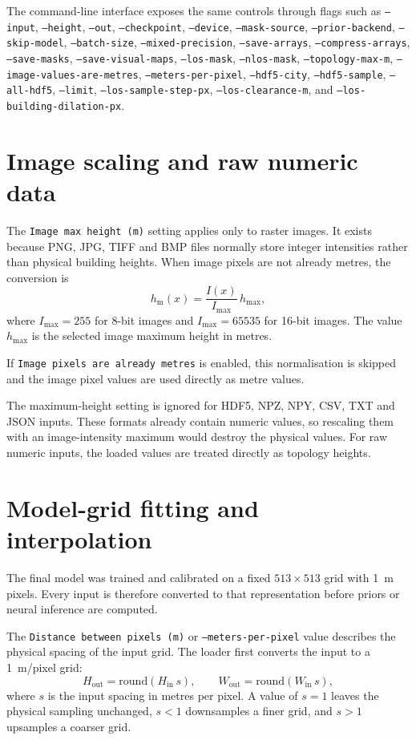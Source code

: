 The command-line interface exposes the same controls through flags such as
\texttt{--input}, \texttt{--height}, \texttt{--out},
\texttt{--checkpoint}, \texttt{--device}, \texttt{--mask-source},
\texttt{--prior-backend},
\texttt{--skip-model}, \texttt{--batch-size}, \texttt{--mixed-precision},
\texttt{--save-arrays}, \texttt{--compress-arrays}, \texttt{--save-masks},
\texttt{--save-visual-maps}, \texttt{--los-mask}, \texttt{--nlos-mask},
\texttt{--topology-max-m}, \texttt{--image-values-are-metres},
\texttt{--meters-per-pixel}, \texttt{--hdf5-city},
\texttt{--hdf5-sample}, \texttt{--all-hdf5}, \texttt{--limit},
\texttt{--los-sample-step-px}, \texttt{--los-clearance-m}, and
\texttt{--los-building-dilation-px}.

\section{Image scaling and raw numeric data}

The \texttt{Image max height (m)} setting applies only to raster images. It
exists because PNG, JPG, TIFF and BMP files normally store integer intensities
rather than physical building heights. When image pixels are not already metres,
the conversion is
\[
  h_{\mathrm{m}}(x) =
  \frac{I(x)}{I_{\max}}\,h_{\max},
\]
where \(I_{\max}=255\) for 8-bit images and \(I_{\max}=65535\) for 16-bit
images. The value \(h_{\max}\) is the selected image maximum height in metres.

If \texttt{Image pixels are already metres} is enabled, this normalisation is
skipped and the image pixel values are used directly as metre values.

The maximum-height setting is ignored for HDF5, NPZ, NPY, CSV, TXT and JSON
inputs. These formats already contain numeric values, so rescaling them with an
image-intensity maximum would destroy the physical values. For raw numeric
inputs, the loaded values are treated directly as topology heights.

\section{Model-grid fitting and interpolation}

The final model was trained and calibrated on a fixed \(513\times513\) grid with
\SI{1}{m} pixels. Every input is therefore converted to that representation
before priors or neural inference are computed.

The \texttt{Distance between pixels (m)} or \texttt{--meters-per-pixel} value
describes the physical spacing of the input grid. The loader first converts the
input to a \SI{1}{m}/pixel grid:
\[
  H_{\mathrm{out}} = \mathrm{round}(H_{\mathrm{in}}\,s),
  \qquad
  W_{\mathrm{out}} = \mathrm{round}(W_{\mathrm{in}}\,s),
\]
where \(s\) is the input spacing in metres per pixel. A value of
\(s=1\) leaves the physical sampling unchanged, \(s<1\) downsamples a finer
grid, and \(s>1\) upsamples a coarser grid.

